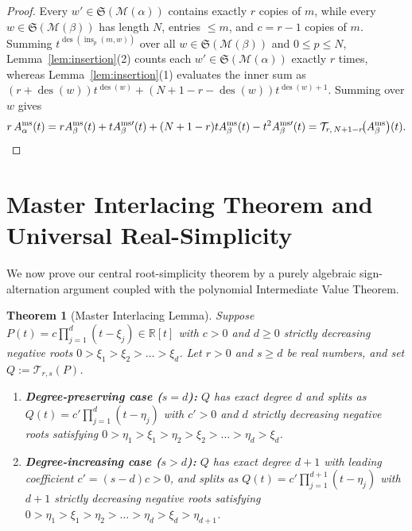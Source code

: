 \documentclass[11pt]{article}
\newtheorem{theorem}{Theorem}[section]
\theoremstyle{definition}
\newcommand{\RR}{\mathbb{R}}
\newcommand{\des}{\operatorname{des}}
\begin{document}
\begin{proof}
Every $w' \in \mathfrak{S}(\mathcal{M}(\alpha))$ contains exactly $r$ copies of $m$, while
every $w \in \mathfrak{S}(\mathcal{M}(\beta))$ has length $N$, entries $\le m$, and
$c = r - 1$ copies of $m$. Summing $t^{\des(\operatorname{ins}_p(m,w))}$ over all
$w \in \mathfrak{S}(\mathcal{M}(\beta))$ and $0 \le p \le N$, Lemma~\ref{lem:insertion}(2)
counts each $w' \in \mathfrak{S}(\mathcal{M}(\alpha))$ exactly $r$ times, whereas
Lemma~\ref{lem:insertion}(1) evaluates the inner sum as $(r + \des(w))t^{\des(w)} +
(N + 1 - r - \des(w))t^{\des(w)+1}$. Summing over $w$ gives
\[
  r\,A_\alpha^{\mathrm{ms}}(t)
  = r A_\beta^{\mathrm{ms}}(t) + t A_\beta^{\mathrm{ms}\prime}(t)
    + (N+1-r)t A_\beta^{\mathrm{ms}}(t) - t^2 A_\beta^{\mathrm{ms}\prime}(t)
  = \mathcal{T}_{r,\,N+1-r}\!\bigl(A_\beta^{\mathrm{ms}}\bigr)(t).\qedhere
\]
\end{proof}

\section{Master Interlacing Theorem and Universal Real-Simplicity}

We now prove our central root-simplicity theorem by a purely algebraic sign-alternation
argument coupled with the polynomial Intermediate Value Theorem.

\begin{theorem}[Master Interlacing Lemma]\label{thm:master-interlacing}
Suppose $P(t) = c \prod_{j=1}^d (t - \xi_j) \in \RR[t]$ with $c > 0$ and $d \ge 0$ strictly
decreasing negative roots $0 > \xi_1 > \xi_2 > \dots > \xi_d$. Let $r > 0$ and $s \ge d$ be
real numbers, and set $Q := \mathcal{T}_{r,s}(P)$.
\begin{enumerate}
  \item \textbf{Degree-preserving case ($s = d$):} $Q$ has exact degree $d$ and splits as
  $Q(t) = c' \prod_{j=1}^d (t - \eta_j)$ with $c' > 0$ and $d$ strictly decreasing negative
  roots satisfying $0 > \eta_1 > \xi_1 > \eta_2 > \xi_2 > \dots > \eta_d > \xi_d$.
  \item \textbf{Degree-increasing case ($s > d$):} $Q$ has exact degree $d+1$ with leading
  coefficient $c' = (s - d)c > 0$, and splits as $Q(t) = c' \prod_{j=1}^{d+1} (t - \eta_j)$
  with $d+1$ strictly decreasing negative roots satisfying
  $0 > \eta_1 > \xi_1 > \eta_2 > \dots > \eta_d > \xi_d > \eta_{d+1}$.
\end{enumerate}
\end{theorem}
\end{document}
